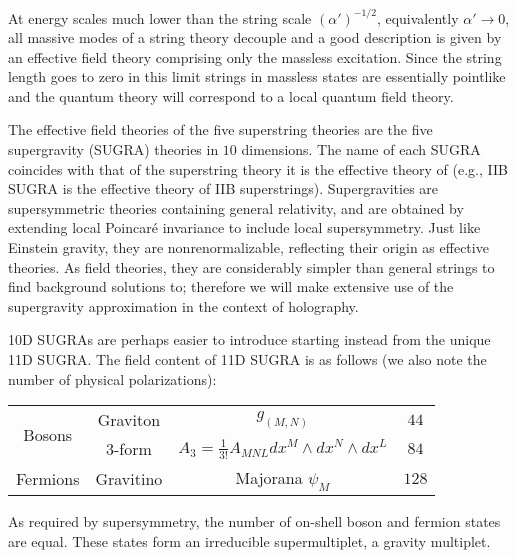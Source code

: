 At energy scales much lower than the string scale $(\alpha')^{-1/2}$, equivalently $\alpha' \rightarrow 0$, all massive modes of a string theory decouple and a good description is given by an effective field theory comprising only the massless excitation. Since the string length goes to zero in this limit strings in massless states are essentially pointlike and the quantum theory will correspond to a local quantum field theory.

The effective field theories of the five superstring theories are the five supergravity (SUGRA) theories in $10$ dimensions. The name of each SUGRA coincides with that of the superstring theory it is the effective theory of (e.g., IIB SUGRA is the effective theory of IIB superstrings). Supergravities are supersymmetric theories containing general relativity, and are obtained by extending local Poincar\'e invariance to include local supersymmetry. Just like Einstein gravity, they are nonrenormalizable, reflecting their origin as effective theories. As field theories, they are considerably simpler than general strings to find background solutions to; therefore we will make extensive use of the supergravity approximation in the context of holography.

10D SUGRAs are perhaps easier to introduce starting instead from the unique 11D SUGRA. The field content of 11D SUGRA is as follows (we also note the number of physical polarizations):



\begin{center}
	\begin{tabular}{|c|c|c|c|}
		\hline
		\multirow{2}{*}{Bosons} &
		Graviton	& $g_{(M,N)}$ 							& $44$\\
		&3-form		& $A_3 = \frac{1}{3!} A_{MNL} dx^M \wedge dx^N \wedge dx^L$	& $84$\\
		\hline \hline 
		
		Fermions & Gravitino	& Majorana $\psi_M$ 						& $128$\\
		\hline
	\end{tabular}
\end{center}

As required by supersymmetry, the number of on-shell boson and fermion states are equal. These states form an irreducible supermultiplet, a gravity multiplet.

